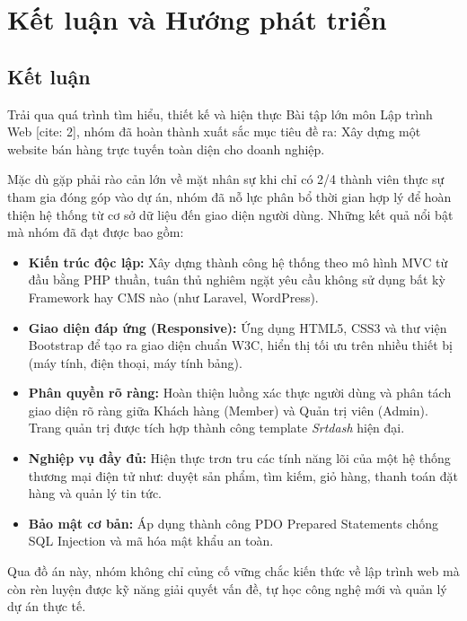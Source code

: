 \section{Kết luận và Hướng phát triển}

\subsection{Kết luận}
Trải qua quá trình tìm hiểu, thiết kế và hiện thực Bài tập lớn môn Lập trình Web [cite: 2], nhóm đã hoàn thành xuất sắc mục tiêu đề ra: Xây dựng một website bán hàng trực tuyến toàn diện cho doanh nghiệp. 

Mặc dù gặp phải rào cản lớn về mặt nhân sự khi chỉ có 2/4 thành viên thực sự tham gia đóng góp vào dự án, nhóm đã nỗ lực phân bổ thời gian hợp lý để hoàn thiện hệ thống từ cơ sở dữ liệu đến giao diện người dùng. Những kết quả nổi bật mà nhóm đã đạt được bao gồm:
\begin{itemize}
    \item \textbf{Kiến trúc độc lập:} Xây dựng thành công hệ thống theo mô hình MVC từ đầu bằng PHP thuần, tuân thủ nghiêm ngặt yêu cầu không sử dụng bất kỳ Framework hay CMS nào (như Laravel, WordPress).
    \item \textbf{Giao diện đáp ứng (Responsive):} Ứng dụng HTML5, CSS3 và thư viện Bootstrap để tạo ra giao diện chuẩn W3C, hiển thị tối ưu trên nhiều thiết bị (máy tính, điện thoại, máy tính bảng).
    \item \textbf{Phân quyền rõ ràng:} Hoàn thiện luồng xác thực người dùng và phân tách giao diện rõ ràng giữa Khách hàng (Member) và Quản trị viên (Admin). Trang quản trị được tích hợp thành công template \textit{Srtdash} hiện đại.
    \item \textbf{Nghiệp vụ đầy đủ:} Hiện thực trơn tru các tính năng lõi của một hệ thống thương mại điện tử như: duyệt sản phẩm, tìm kiếm, giỏ hàng, thanh toán đặt hàng và quản lý tin tức.
    \item \textbf{Bảo mật cơ bản:} Áp dụng thành công PDO Prepared Statements chống SQL Injection và mã hóa mật khẩu an toàn.
\end{itemize}

Qua đồ án này, nhóm không chỉ củng cố vững chắc kiến thức về lập trình web mà còn rèn luyện được kỹ năng giải quyết vấn đề, tự học công nghệ mới và quản lý dự án thực tế.

